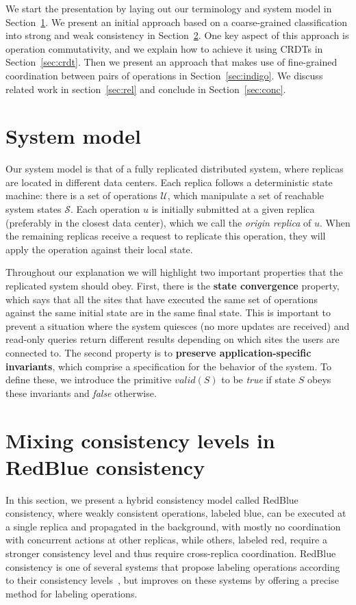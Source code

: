 \documentclass[11pt]{article}
\begin{document}
We start the presentation by laying out our terminology and system model in Section~\ref{sec:model}. We present an initial approach based on a coarse-grained classification into strong and weak consistency in Section~\ref{sec:redblue}. One key aspect of this approach is operation commutativity, and we explain how to achieve it using CRDTs in Section~\ref{sec:crdt}. Then we present an approach that makes use of fine-grained coordination between pairs of operations in Section~\ref{sec:indigo}. We discuss related work in section~\ref{sec:rel} and conclude in Section~\ref{sec:conc}.

\section{System model}
\label{sec:model}


Our system model is that of a
fully replicated distributed system, where replicas are located in different data centers. Each replica follows a deterministic state machine: there is a set of operations $\mathcal{U}$, which manipulate
a set of reachable system states $\mathcal{S}$.
Each operation $u$ is initially submitted at a given replica (preferably in the closest data center), which we
call the \emph{origin replica} of $u$.
When the remaining replicas receive a request to replicate this operation, they will apply the operation against their local state.

Throughout our explanation we will highlight two important properties
that the replicated system should obey. First, there is
the {\bf state convergence} property, which says that all the sites
that have executed the same set of operations against the same initial state are in the same final state.
This is important to prevent a situation where
the system quiesces (no more updates are received) and
read-only queries return different results
depending on which sites the users are connected to.
The second property is to {\bf preserve application-specific invariants}, which comprise a specification for the behavior of the system.
To define these, we introduce the primitive $\textit{valid}(S)$ to be {\it
  true} if state $S$ obeys these invariants and {\it false}
otherwise.

\section{Mixing consistency levels in RedBlue consistency}
\label{sec:redblue}

In this section, we present a hybrid consistency model called RedBlue
consistency, where weakly consistent operations, labeled blue, can be executed at a
single replica and propagated in the background, with mostly no
coordination with concurrent actions at other replicas, while others, labeled red,
require a stronger consistency level and thus require cross-replica
coordination. RedBlue consistency is one of several systems that
propose labeling operations according to their consistency levels~\cite{Ladin1992LazyReplication, Singh2009Zeno,Li2012RedBlue,Pileus}, but improves on these systems by offering a precise method for labeling operations.
\end{document}
